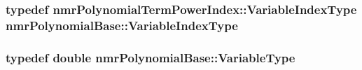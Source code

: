 \hypertarget{classnmr_polynomial_base_aae95477e451ddc7d3ee3f41cbdaadde2}{
\subsubsection[{Variable\-Index\-Type}]{\setlength{\rightskip}{0pt plus 5cm}typedef {\bf nmr\-Polynomial\-Term\-Power\-Index\-::\-Variable\-Index\-Type} {\bf nmr\-Polynomial\-Base\-::\-Variable\-Index\-Type}}}\label{classnmr_polynomial_base_aae95477e451ddc7d3ee3f41cbdaadde2}
\hypertarget{classnmr_polynomial_base_a666e909572cf22856c965d47f243a633}{
\subsubsection[{Variable\-Type}]{\setlength{\rightskip}{0pt plus 5cm}typedef double {\bf nmr\-Polynomial\-Base\-::\-Variable\-Type}}}\label{classnmr_polynomial_base_a666e909572cf22856c965d47f243a633}


